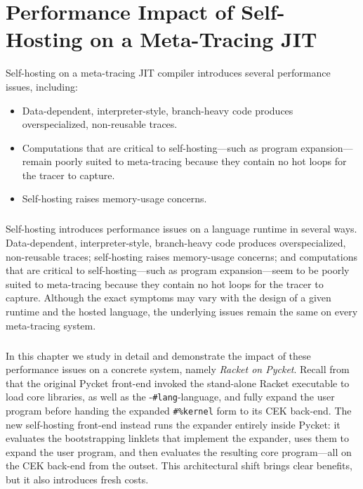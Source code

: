 \chapter{Performance Impact of Self-Hosting on a Meta-Tracing JIT}

	\label{chapter:problem}

	\begin{chapterpoint}
		Self-hosting on a meta-tracing JIT compiler introduces several performance issues, including:
		\begin{itemize}
			\item Data-dependent, interpreter-style, branch-heavy code produces overspecialized, non-reusable traces.
			\item Computations that are critical to self-hosting—such as program expansion—remain poorly suited to meta-tracing because they contain no hot loops for the tracer to capture.
			\item Self-hosting raises memory-usage concerns.
		\end{itemize}
	\end{chapterpoint}

	\paragraph{}%
	 	Self-hosting introduces performance issues on a language runtime in several ways. Data-dependent, interpreter-style, branch-heavy code produces overspecialized, non-reusable traces; self-hosting raises memory-usage concerns; and computations that are critical to self-hosting—such as program expansion—seem to be poorly suited to meta-tracing because they contain no hot loops for the tracer to capture. Although the exact symptoms may vary with the design of a given runtime and the hosted language, the underlying issues remain the same on every meta-tracing system.

	\paragraph{}%
	 	In this chapter we study in detail and demonstrate the impact of these performance issues on a concrete system, namely \emph{Racket on Pycket}. Recall from  that the original Pycket front-end invoked the stand-alone Racket executable to load core libraries, as well as the -\verb|#lang|-language, and fully expand the user program before handing the expanded \verb|#%kernel| form to its CEK back-end. The new self-hosting front-end instead runs the expander entirely inside Pycket: it evaluates the bootstrapping linklets that implement the expander, uses them to expand the user program, and then evaluates the resulting core program—all on the CEK back-end from the outset. This architectural shift brings clear benefits, but it also introduces fresh costs.

